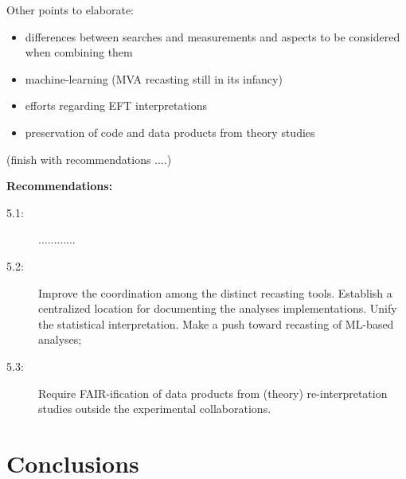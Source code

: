 \documentclass[11pt]{article}
\begin{document}
%
%

Other points to elaborate:
\begin{itemize}
    \item differences between searches and measurements and aspects to be considered when combining them
    \item machine-learning (MVA recasting still in its infancy)
    \item efforts regarding EFT interpretations
    \item preservation of code and data products from theory studies
\end{itemize}

(finish with recommendations ....)

\noindent
\textbf{Recommendations:}
\begin{description}
   \item[5.1:] ............
   \item[5.2:] Improve the coordination among the distinct recasting tools. Establish a centralized location for documenting the analyses implementations. Unify the statistical interpretation. Make a push toward recasting of ML-based analyses;
   \item[5.3:] Require FAIR-ification of data products from (theory) re-interpretation studies outside the experimental collaborations. %
\end{description}
\section{Conclusions}

\def\thefootnote{\fnsymbol{footnote}}
\setcounter{footnote}{0}




\end{document}
